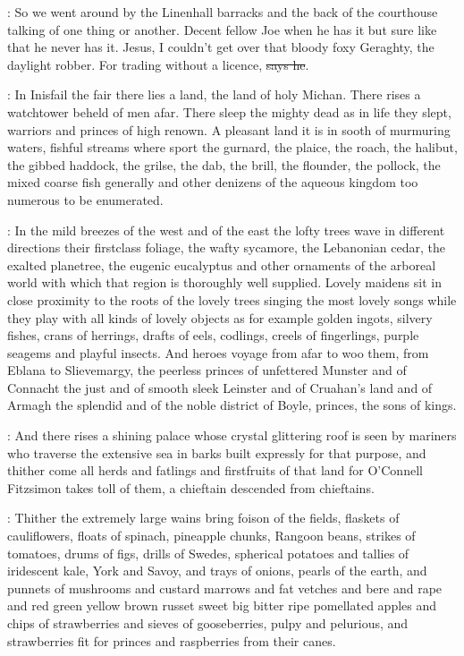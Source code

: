 \Nq:
So we went around by the Linenhall barracks and the back of the
courthouse talking of one thing or another. Decent fellow Joe when he has
it but sure like that he never has it. Jesus, I couldn't get over that
bloody foxy Geraghty, the daylight robber. For trading without a licence,
\sout{says he}.

:
In Inisfail the fair there lies a land, the land of holy Michan. There
rises a watchtower beheld of men afar. There sleep the mighty dead as in
life they slept, warriors and princes of high renown. A pleasant land it
is in sooth of murmuring waters, fishful streams where sport the gurnard,
the plaice, the roach, the halibut, the gibbed haddock, the grilse,
the dab, the brill, the flounder, the pollock, the mixed coarse fish
generally and other denizens of the aqueous kingdom too numerous to be
enumerated.

:
In the mild breezes of the west and of the east the lofty
trees wave in different directions their firstclass foliage, the wafty
sycamore, the Lebanonian cedar, the exalted planetree, the eugenic
eucalyptus and other ornaments of the arboreal world with which that
region is thoroughly well supplied. Lovely maidens sit in close proximity
to the roots of the lovely trees singing the most lovely songs while they
play with all kinds of lovely objects as for example golden ingots,
silvery fishes, crans of herrings, drafts of eels, codlings, creels of
fingerlings, purple seagems and playful insects.  And heroes voyage from
afar to woo them, from Eblana to Slievemargy, the peerless princes of
unfettered Munster and of Connacht the just and of smooth sleek Leinster
and of Cruahan's land and of Armagh the splendid and of the noble district
of Boyle, princes, the sons of kings.

:
And there rises a shining palace whose crystal glittering roof is seen by
mariners who traverse the extensive sea in barks built expressly for that
purpose, and thither come all herds and fatlings and firstfruits of that
land for O'Connell Fitzsimon takes toll of them, a chieftain descended
from chieftains.

:
Thither the extremely large wains bring foison of the
fields, flaskets of cauliflowers, floats of spinach, pineapple chunks,
Rangoon beans, strikes of tomatoes, drums of figs, drills of Swedes,
spherical potatoes and tallies of iridescent kale, York and Savoy, and
trays of onions, pearls of the earth, and punnets of mushrooms and
custard marrows and fat vetches and bere and rape and red green yellow
brown russet sweet big bitter ripe pomellated apples and chips of
strawberries and sieves of gooseberries, pulpy and pelurious, and
strawberries fit for princes and raspberries from their canes.

